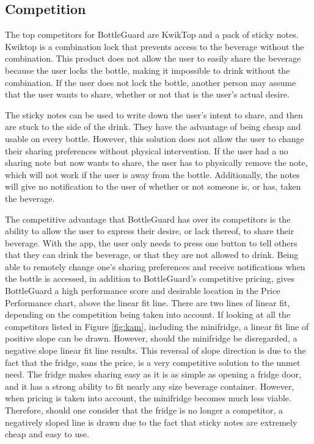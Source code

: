 \documentclass[12pt]{article}
\begin{document}
	\subsection*{Competition}
	The top competitors for BottleGuard are KwikTop and a pack of sticky notes. Kwiktop is a combination lock that prevents access to the beverage without the combination. This product does not allow the user to easily share the beverage because the user locks the bottle, making it impossible to drink without the combination. If the user does not lock the bottle, another person may assume that the user wants to share, whether or not that is the user’s actual desire. 
	
	The sticky notes can be used to write down the user’s intent to share, and then are stuck to the side of the drink. They have the advantage of being cheap and usable on every bottle. However, this solution does not allow the user to change their sharing preferences without physical intervention. If the user had a no sharing note but now wants to share, the user has to physically remove the note, which will not work if the user is away from the bottle. Additionally, the notes will give no notification to the user of whether or not someone is, or has, taken the beverage. 
	
	The competitive advantage that BottleGuard has over its competitors is the ability to allow the user to express their desire, or lack thereof, to share their beverage. With the app, the user only needs to press one button to tell others that they can drink the beverage, or that they are not allowed to drink.  Being able to remotely change one’s sharing preferences and receive notifications when the bottle is accessed, in addition to BottleGuard’s competitive pricing, gives BottleGuard a high performance score and desirable location in the Price Performance chart, above the linear fit line. 
	There are two lines of linear fit, depending on the competition being taken into account.  If looking at all the competitors listed in Figure \ref{fig:kam}, including the minifridge, a linear fit line of positive slope can be drawn.  However, should the minifridge be disregarded, a negative slope linear fit line results.  This reversal of slope direction is due to the fact that the fridge, sans the price, is a very competitive solution to the unmet need.  The fridge makes sharing easy as it is as simple as opening a fridge door, and it has a strong ability to fit nearly any size beverage container.  However, when pricing is taken into account, the minifridge becomes much less viable.  Therefore, should one consider that the fridge is no longer a competitor, a negatively sloped line is drawn due to the fact that sticky notes are extremely cheap and easy to use.
	
\end{document}
